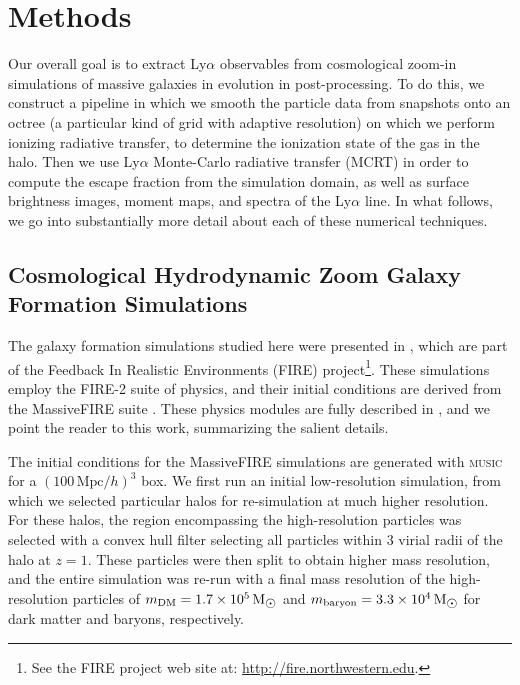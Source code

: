 \chapter{Methods}
\label{sec:methods}

Our overall goal is to extract Ly$\alpha$ observables from cosmological zoom-in simulations of massive galaxies in evolution in post-processing.
To do this, we construct a pipeline in which we smooth the particle data from snapshots onto an octree (a particular kind of grid with adaptive resolution) on which we perform ionizing radiative transfer, to determine the ionization state of the gas in the halo.
Then we use Ly$\alpha$ Monte-Carlo radiative transfer (MCRT) in order to compute the escape fraction from the simulation domain, as well as surface brightness images, moment maps, and spectra of the Ly$\alpha$ line.
In what follows, we go into substantially more detail about each of these numerical techniques.

\section{Cosmological Hydrodynamic Zoom Galaxy Formation Simulations}

The galaxy formation simulations studied here were presented in \citet{Anglesalcazar2017a,Anglesalcazar2017b}, which are part of the Feedback In Realistic Environments (FIRE) project\footnote{See the FIRE project web site at: \href{http://fire.northwestern.edu}{http://fire.northwestern.edu}.}.
These simulations employ the FIRE-2 suite of physics, and their initial conditions are derived from the MassiveFIRE suite \citet{Hopkins2018}.
These physics modules are fully described in \citet{Hopkins2018}, and we point the reader to this work, summarizing the salient details.

The initial conditions for the MassiveFIRE simulations are generated with \textsc{music} \citep{Hahn2011} for a $(100\,\text{Mpc}/h)^3$ box.
We first run an initial low-resolution simulation, from which we selected particular halos for re-simulation at much higher resolution.
For these halos, the region encompassing the high-resolution particles was selected with a convex hull filter selecting all particles within $3$ virial radii of the halo at $z=1.$
These particles were then split to obtain higher mass resolution, and the entire simulation was re-run with a final mass resolution of the high-resolution particles of $m_\text{DM} = 1.7 \times 10^5\,\Msun$ and $m_\text{baryon} = 3.3 \times 10^4\,\Msun$ for dark matter and baryons, respectively.

